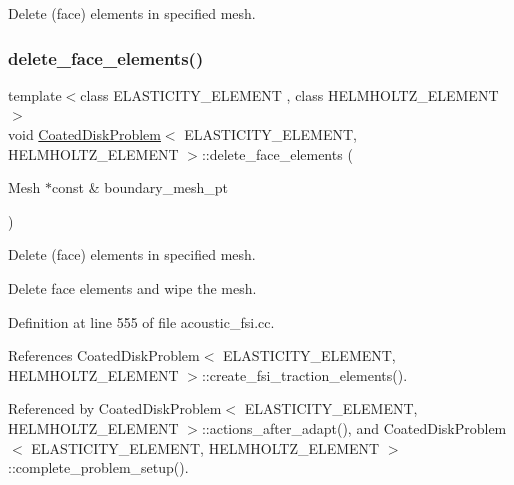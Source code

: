 Delete (face) elements in specified mesh. 

\mbox{\label{classCoatedDiskProblem_a55b4cead41e01ab5fd728b607f62bb74}} 
\subsubsection{\texorpdfstring{delete\+\_\+face\+\_\+elements()}{delete\_face\_elements()}\hspace{0.1cm}{\footnotesize\ttfamily [2/2]}}
{\footnotesize\ttfamily template$<$class E\+L\+A\+S\+T\+I\+C\+I\+T\+Y\+\_\+\+E\+L\+E\+M\+E\+NT , class H\+E\+L\+M\+H\+O\+L\+T\+Z\+\_\+\+E\+L\+E\+M\+E\+NT $>$ \\
void \hyperlink{classCoatedDiskProblem}{Coated\+Disk\+Problem}$<$ E\+L\+A\+S\+T\+I\+C\+I\+T\+Y\+\_\+\+E\+L\+E\+M\+E\+NT, H\+E\+L\+M\+H\+O\+L\+T\+Z\+\_\+\+E\+L\+E\+M\+E\+NT $>$\+::delete\+\_\+face\+\_\+elements (\begin{DoxyParamCaption}\item[{Mesh $\ast$const \&}]{boundary\+\_\+mesh\+\_\+pt }\end{DoxyParamCaption})\hspace{0.3cm}{\ttfamily [private]}}



Delete (face) elements in specified mesh. 

Delete face elements and wipe the mesh. 

Definition at line 555 of file acoustic\+\_\+fsi.\+cc.



References Coated\+Disk\+Problem$<$ E\+L\+A\+S\+T\+I\+C\+I\+T\+Y\+\_\+\+E\+L\+E\+M\+E\+N\+T, H\+E\+L\+M\+H\+O\+L\+T\+Z\+\_\+\+E\+L\+E\+M\+E\+N\+T $>$\+::create\+\_\+fsi\+\_\+traction\+\_\+elements().



Referenced by Coated\+Disk\+Problem$<$ E\+L\+A\+S\+T\+I\+C\+I\+T\+Y\+\_\+\+E\+L\+E\+M\+E\+N\+T, H\+E\+L\+M\+H\+O\+L\+T\+Z\+\_\+\+E\+L\+E\+M\+E\+N\+T $>$\+::actions\+\_\+after\+\_\+adapt(), and Coated\+Disk\+Problem$<$ E\+L\+A\+S\+T\+I\+C\+I\+T\+Y\+\_\+\+E\+L\+E\+M\+E\+N\+T, H\+E\+L\+M\+H\+O\+L\+T\+Z\+\_\+\+E\+L\+E\+M\+E\+N\+T $>$\+::complete\+\_\+problem\+\_\+setup().

\mbox{\label{classCoatedDiskProblem_af8e103d494f526c0e24c0c4ccef4ea6b}} 
